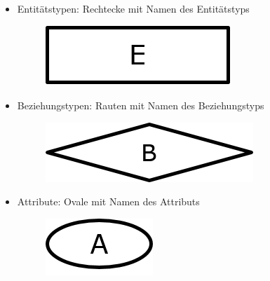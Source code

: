 \begin{frame}{\insertsection}
\newline
\begin{itemize}
	\item Entit\"atstypen: Rechtecke mit Namen des Entit\"atstyps
		\begin{figure}
			\includegraphics[scale=0.5]{img/ERM-EntitaetTyp.png}
		\end{figure}
	\item Beziehungstypen: Rauten mit Namen des Beziehungstyps
		\begin{figure}
			\includegraphics[scale=0.5]{img/ERM-BeziehungTyp.png}
		\end{figure}
	\item Attribute: Ovale mit Namen des Attributs
	  \begin{figure}
	  	\includegraphics[scale=0.5]{img/ERM-AttributTyp.png}
  	\end{figure}
\end{itemize}
\end{frame}

